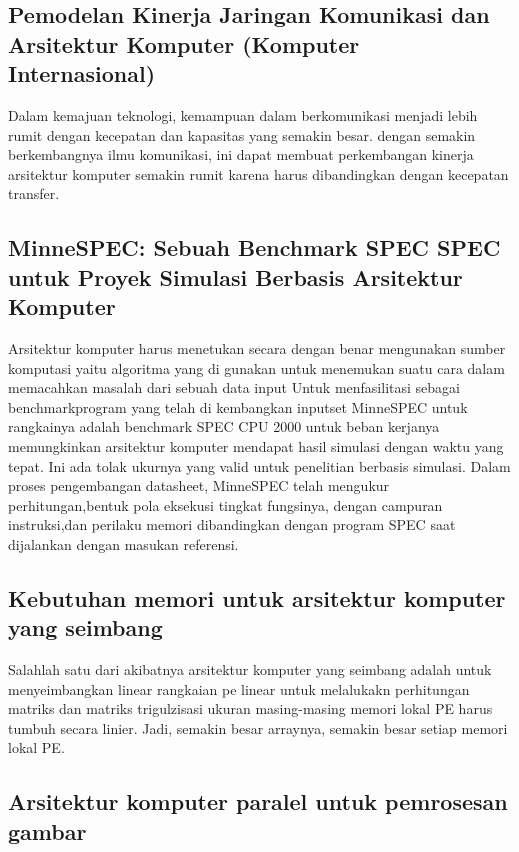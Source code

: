 	\subsection{Pemodelan Kinerja Jaringan Komunikasi dan Arsitektur Komputer (Komputer Internasional)}

	Dalam kemajuan teknologi, kemampuan dalam berkomunikasi menjadi lebih rumit dengan kecepatan dan kapasitas yang semakin besar. 
	dengan semakin berkembangnya ilmu komunikasi, ini dapat membuat perkembangan kinerja arsitektur komputer semakin rumit karena harus dibandingkan 
	dengan kecepatan transfer.\cite{harrison1992performance}

	\subsection{MinneSPEC: Sebuah Benchmark SPEC SPEC untuk Proyek Simulasi Berbasis Arsitektur Komputer}

	Arsitektur komputer harus menetukan secara dengan benar mengunakan sumber komputasi yaitu algoritma yang di gunakan untuk menemukan suatu cara dalam memacahkan masalah dari sebuah data input
	Untuk menfasilitasi sebagai benchmarkprogram yang telah di kembangkan inputset MinneSPEC untuk rangkainya adalah benchmark SPEC CPU 2000 untuk beban kerjanya  memungkinkan arsitektur komputer mendapat hasil simulasi dengan waktu yang tepat.
	Ini ada tolak ukurnya  yang valid untuk penelitian berbasis simulasi. 
	Dalam proses pengembangan datasheet, MinneSPEC telah mengukur perhitungan,bentuk pola eksekusi tingkat fungsinya, dengan campuran instruksi,dan perilaku memori dibandingkan dengan program SPEC saat dijalankan dengan masukan referensi.\cite{kleinosowski2002minnespec}

	\subsection{Kebutuhan memori untuk arsitektur komputer yang seimbang}

	Salahlah satu dari akibatnya arsitektur komputer yang seimbang  adalah untuk menyeimbangkan linear rangkaian pe linear untuk melalukakn perhitungan matriks dan matriks trigulzisasi ukuran masing-masing memori lokal PE harus tumbuh secara linier.
	Jadi, semakin besar arraynya, semakin besar setiap memori lokal PE.\cite{kung1986memory}

	\subsection{Arsitektur komputer paralel untuk pemrosesan gambar}

